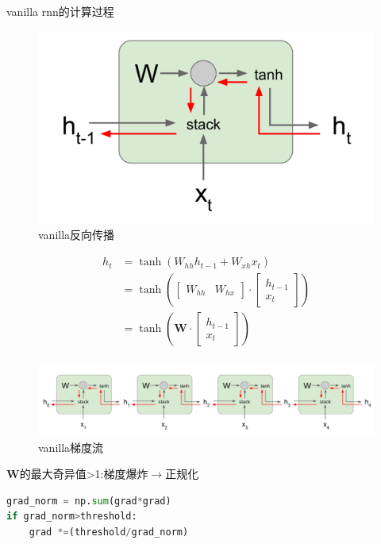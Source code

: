 \documentclass{article}
\begin{document}
vanilla rnn的计算过程
\begin{figure}[H]
\centering
\includegraphics[scale=0.4]{figure/vanilla_rnn_bp.PNG}
\caption{vanilla反向传播}
\label{fig:15}
\end{figure}
\begin{equation}\label{eq:4}
\begin{split}
h_t&=\tanh(W_{hh}h_{t-1}+W_{xh}x_t)\\
&=\tanh\left(\begin{bmatrix}W_{hh}&W_{hx}\end{bmatrix}\cdot\begin{bmatrix}h_{t-1}\\x_t\end{bmatrix}\right)\\
&=\tanh\left(\mathbf{W}\cdot\begin{bmatrix}h_{t-1}\\x_t\end{bmatrix}\right)\\
\end{split}
\end{equation}
\begin{figure}[H]
\centering
\includegraphics[scale=0.4]{figure/vanilla_grad.PNG}
\caption{vanilla梯度流}
\label{fig:16}
\end{figure}
$\mathbf{W}$的最大奇异值>1:梯度爆炸$\rightarrow$正规化
\begin{lstlisting}[language=Python]
grad_norm = np.sum(grad*grad)
if grad_norm>threshold:
    grad *=(threshold/grad_norm)
\end{lstlisting}
\end{document}
